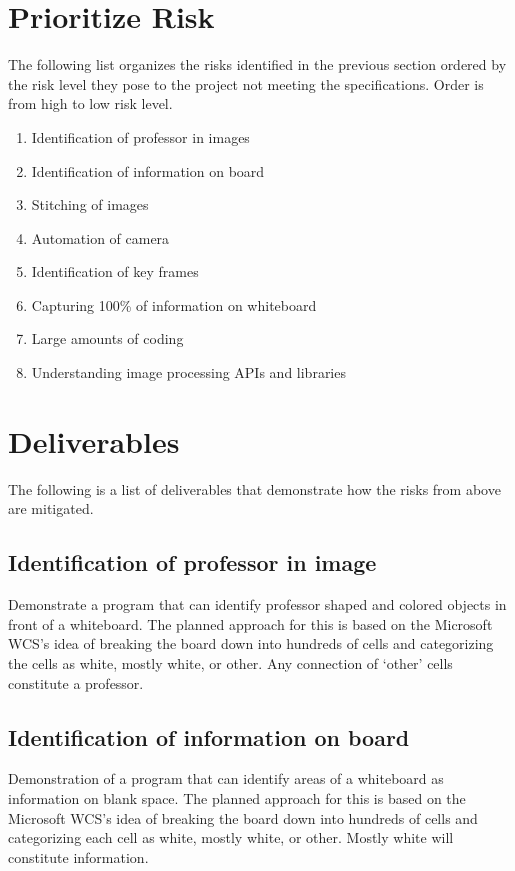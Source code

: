 \documentclass[]{article}
\begin{document}
			
	\section{Prioritize Risk}
		The following list organizes the risks identified in the previous section ordered by the risk level they pose to the project not meeting the specifications. Order is from high to low risk level.
		\begin{enumerate}
			\item Identification of professor in images
			\item Identification of information on board
			\item Stitching of images
			\item Automation of camera
			\item Identification of key frames
			\item Capturing 100\% of information on whiteboard
			\item Large amounts of coding
			\item Understanding image processing APIs and libraries
		\end{enumerate}
		
	\section{Deliverables}
		The following is a list of deliverables that demonstrate how the risks from above are mitigated.
		
		\subsection{Identification of professor in image}
			Demonstrate a program that can identify professor shaped and colored objects in front of a whiteboard. The planned approach for this is based on the Microsoft WCS's idea of breaking the board down into hundreds of cells and categorizing the cells as white, mostly white, or other. Any connection of `other' cells constitute a professor.
		
		\subsection{Identification of information on board}
			Demonstration of a program that can identify areas of a whiteboard as information on blank space. The planned approach for this is based on the Microsoft WCS's idea of breaking the board down into hundreds of cells and categorizing each cell as white, mostly white, or other. Mostly white will constitute information.
			
\end{document}

